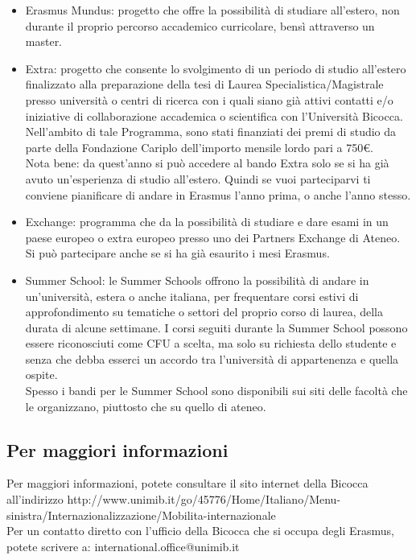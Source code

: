 \begin{itemize}
\item Erasmus Mundus: progetto che offre la possibilità di studiare all'estero, non durante il proprio percorso accademico curricolare, bensì attraverso un master. 

\item Extra: progetto che consente lo svolgimento di un periodo di studio all'estero finalizzato alla preparazione della tesi di Laurea Specialistica/Magistrale presso università o centri di ricerca con i quali siano già attivi contatti e/o iniziative di collaborazione accademica o scientifica con l'Università Bicocca. Nell'ambito di tale Programma, sono stati finanziati dei premi di studio da parte della Fondazione Cariplo dell'importo mensile lordo pari a 750€.\\
Nota bene: da quest'anno si può accedere al bando Extra solo se si ha già avuto un'esperienza di studio all'estero. Quindi se vuoi parteciparvi ti conviene pianificare di andare in Erasmus l'anno prima, o anche l'anno stesso.

\item Exchange: programma che da la possibilità di studiare e dare esami in un paese europeo o extra europeo presso uno dei Partners Exchange di Ateneo. Si può partecipare anche se si ha già esaurito i mesi Erasmus.

\item Summer School: le Summer Schools offrono la possibilità di andare in un'università, estera o anche italiana, per frequentare corsi estivi di approfondimento su tematiche o settori del proprio corso di laurea, della durata di alcune settimane. I corsi seguiti durante la Summer School possono essere riconosciuti come CFU a scelta, ma solo su richiesta dello studente e senza che debba esserci un accordo tra l'università di appartenenza e quella ospite.\\
Spesso i bandi per le Summer School sono disponibili sui siti delle facoltà che le organizzano, piuttosto che su quello di ateneo.
\end{itemize}


\subsection{Per maggiori informazioni}
Per maggiori informazioni, potete consultare il sito internet della Bicocca all'indirizzo http://www.unimib.it/go/45776/Home/Italiano/Menu-sinistra/Internazionalizzazione/Mobilita-internazionale \\
Per un contatto diretto con l'ufficio della Bicocca che si occupa degli Erasmus, potete scrivere a: international.office@unimib.it

